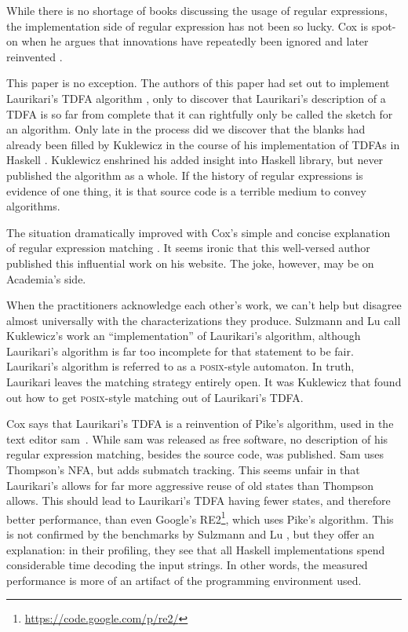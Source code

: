 \documentclass[english,twocolumn]{article}
\theoremstyle{definition}
\begin{document}
While there is no shortage of books discussing the usage of regular
expressions, the implementation side of regular expression has not
been so lucky. Cox is spot-on when he argues that innovations have
repeatedly been ignored and later reinvented \cite{Cox07a,Cox09a,Cox10a}. 

This paper is no exception. The authors of this paper had set out
to implement Laurikari's TDFA algorithm \cite{Laur00a},
only to discover that Laurikari's description of a TDFA is so far
from complete that it can rightfully only be called the sketch for
an algorithm. Only late in the process did we discover that the blanks
had already been filled by Kuklewicz in the course of his implementation
of TDFAs in Haskell \cite{Kukl07a}. Kuklewicz enshrined his
added insight into Haskell library, but never published the algorithm
as a whole. If the history of regular expressions is evidence of one
thing, it is that source code is a terrible medium to convey algorithms. 

The situation dramatically improved with Cox's simple and concise
explanation of regular expression matching \cite{Cox07a}. It seems
ironic that this well-versed author published this influential work
on his website. The joke, however, may be on Academia's side.

When the practitioners acknowledge each other's work, we can't
help but disagree almost universally with the characterizations they
produce. Sulzmann and Lu \cite{Sulz12a} call Kuklewicz's
work an ``implementation'' of Laurikari's algorithm, although Laurikari's
algorithm is far too incomplete for that statement to be fair. Laurikari's
algorithm is referred to as a \textsc{posix}-style automaton. In truth, Laurikari
leaves the matching strategy entirely open. It was Kuklewicz that
found out how to get \textsc{posix}-style matching out of Laurikari's TDFA. 

Cox says that Laurikari's TDFA is a reinvention of Pike's algorithm,
used in the text editor sam~\cite{Pike87a}.  While sam was released
as free software, no description of his regular expression matching,
besides the source code, was published.  Sam uses Thompson's NFA,
but adds submatch tracking. This seems unfair in that Laurikari's
allows for far more aggressive reuse of old states than Thompson
allows. This should lead to Laurikari's TDFA having fewer states,
and therefore better performance, than even Google's
RE2\footnote{\url{https://code.google.com/p/re2/}}, which uses
Pike's algorithm.  This is not confirmed by the benchmarks by
Sulzmann and Lu \cite{Sulz12a}, but they offer an explanation: in
their profiling, they see that all Haskell implementations spend
considerable time decoding the input strings. In other words, the
measured performance is more of an artifact of the programming
environment used.
\end{document}
